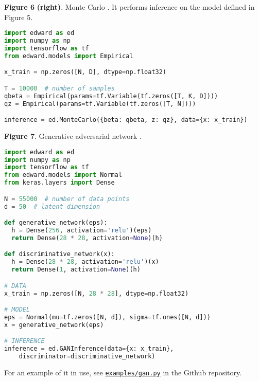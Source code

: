 \textbf{Figure 6} \textbf{(right)}. Monte Carlo \citep{robert1999monte}.
It performs inference on the model defined in Figure 5.
\begin{lstlisting}[language=python]
import edward as ed
import numpy as np
import tensorflow as tf
from edward.models import Empirical

x_train = np.zeros([N, D], dtype=np.float32)

T = 10000  # number of samples
qbeta = Empirical(params=tf.Variable(tf.zeros([T, K, D])))
qz = Empirical(params=tf.Variable(tf.zeros([T, N])))

inference = ed.MonteCarlo({beta: qbeta, z: qz}, data={x: x_train})
\end{lstlisting}

\textbf{Figure 7}. Generative adversarial network
\citep{goodfellow2014generative}.
\begin{lstlisting}[language=python]
import edward as ed
import numpy as np
import tensorflow as tf
from edward.models import Normal
from keras.layers import Dense

N = 55000  # number of data points
d = 50  # latent dimension

def generative_network(eps):
  h = Dense(256, activation='relu')(eps)
  return Dense(28 * 28, activation=None)(h)

def discriminative_network(x):
  h = Dense(28 * 28, activation='relu')(x)
  return Dense(1, activation=None)(h)

# DATA
x_train = np.zeros([N, 28 * 28], dtype=np.float32)

# MODEL
eps = Normal(mu=tf.zeros([N, d]), sigma=tf.ones([N, d]))
x = generative_network(eps)

# INFERENCE
inference = ed.GANInference(data={x: x_train},
    discriminator=discriminative_network)
\end{lstlisting}
For an example of it in use, see
\href{https://github.com/blei-lab/edward/blob/master/examples/gan.py}{\texttt{examples/gan.py}}
in the Github repository.

